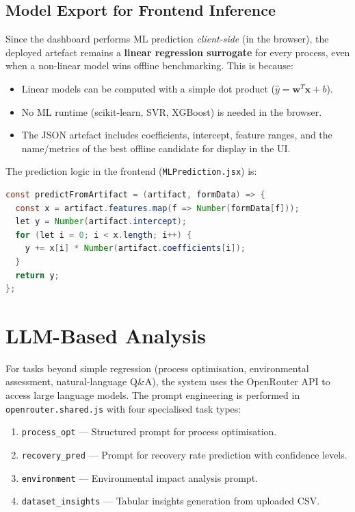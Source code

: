 \documentclass[12pt,a4paper]{report}
\newcommand{\code}[1]{\texttt{#1}}
\begin{document}
\subsection{Model Export for Frontend Inference}

Since the dashboard performs ML prediction \emph{client-side} (in the browser), the deployed artefact remains a \textbf{linear regression surrogate} for every process, even when a non-linear model wins offline benchmarking. This is because:
\begin{itemize}[nosep]
  \item Linear models can be computed with a simple dot product ($\hat{y} = \mathbf{w}^T\mathbf{x} + b$).
  \item No ML runtime (scikit-learn, SVR, XGBoost) is needed in the browser.
  \item The JSON artefact includes coefficients, intercept, feature ranges, and the name/metrics of the best offline candidate for display in the UI.
\end{itemize}

The prediction logic in the frontend (\code{MLPrediction.jsx}) is:
\begin{lstlisting}[language=Java, caption={Client-side linear regression inference.}]
const predictFromArtifact = (artifact, formData) => {
  const x = artifact.features.map(f => Number(formData[f]));
  let y = Number(artifact.intercept);
  for (let i = 0; i < x.length; i++) {
    y += x[i] * Number(artifact.coefficients[i]);
  }
  return y;
};
\end{lstlisting}

\section{LLM-Based Analysis}

For tasks beyond simple regression (process optimisation, environmental assessment, natural-language Q\&A), the system uses the OpenRouter API to access large language models. The prompt engineering is performed in \code{openrouter.shared.js} with four specialised task types:

\begin{enumerate}[nosep]
  \item \code{process\_opt} — Structured prompt for process optimisation.
  \item \code{recovery\_pred} — Prompt for recovery rate prediction with confidence levels.
  \item \code{environment} — Environmental impact analysis prompt.
  \item \code{dataset\_insights} — Tabular insights generation from uploaded CSV.
\end{enumerate}
\end{document}
